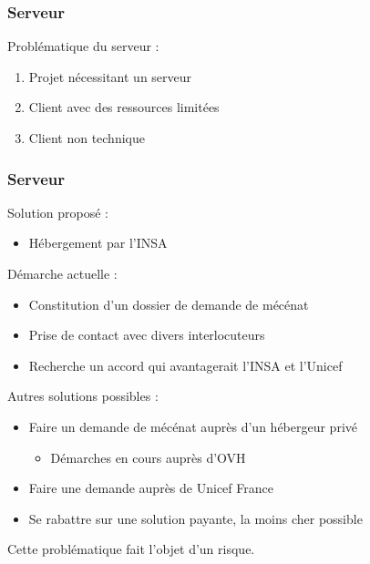 \begin{frame}
	\frametitle{Serveur}

    Problématique du serveur :
      \begin{enumerate}
        \item Projet nécessitant un serveur
        \item Client avec des ressources limitées
        \item Client non technique
      \end{enumerate}
      
\end{frame}


\begin{frame}
	\frametitle{Serveur}
	Solution proposé :
	\begin{itemize}	
    \item Hébergement par l'INSA
    \end{itemize}
    Démarche actuelle :
      \begin{itemize}
        \item Constitution d'un dossier de demande de mécénat
        \item Prise de contact avec divers interlocuteurs
        \item Recherche un accord qui avantagerait l'INSA et l'Unicef
      \end{itemize}
    Autres solutions possibles :
      \begin{itemize}
        \item Faire un demande de mécénat auprès d'un hébergeur privé
		\begin{itemize}
			\item Démarches en cours auprès d'OVH        
        \end{itemize}
        \item Faire une demande auprès de Unicef France
        \item Se rabattre sur une solution payante, la moins cher possible
      \end{itemize}
    \begin{center}
    \begin{tiny}
    Cette problématique fait l'objet d'un risque.
    \end{tiny}
    \end{center}
\end{frame}